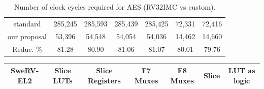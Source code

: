 \begin{table}[tp]
\begin{tabular}{ccccccc}
    \cellcolor[HTML]{EFEFEF}standard     & 285,245              & 285,593              & 285,439              & 285,425              & 72,331               & 72,416               \\
    \cellcolor[HTML]{EFEFEF}our proposal & 53,396               & 54,548               & 54,054               & 54,036               & 14,462               & 14,660               \\
    \cellcolor[HTML]{EFEFEF}Reduc. \%    & 81.28                & 80.90                & 81.06                & 81.07                & 80.01                & 79.76               
    \end{tabular}
    \caption{Number of clock cycles required for AES (RV32IMC vs custom).}
    \label{tab:aes}
\end{table}
\begin{table}[tp]
    \begin{tabular}{ccccccc}
    \rowcolor[HTML]{C0C0C0} 
    SweRV-EL2                       & Slice LUTs           & Slice Registers      & F7 Muxes             & F8 Muxes             & Slice                          & LUT as logic                   \\ \hline

\end{tabular}
\end{table}
